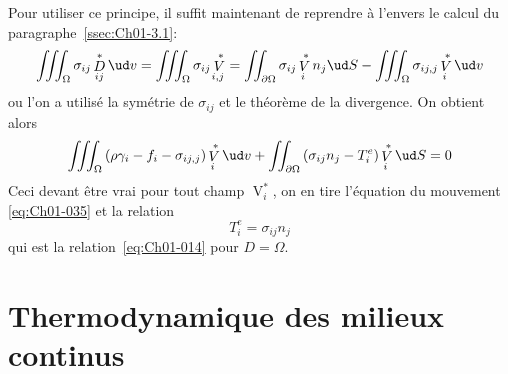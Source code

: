 Pour utiliser ce principe, il suffit maintenant de reprendre à l'envers le calcul du paragraphe~\ref{ssec:Ch01-3.1}:
\begin{equation*}
    \iiint_{\Omega} \sigma_{ij} \mathop{D}^{\ast}_{ij} \ud v = \iiint_{\Omega} \sigma_{ij} \mathop{V}^{\ast}_{i,j} = \iint_{\partial \Omega} \sigma_{ij} \mathop{V}^{\ast}_{i} n_j \ud S - \iiint_{\Omega} \sigma_{ij,j} \mathop{V}^{\ast}_{i} \ud v
\end{equation*}
ou l'on a utilisé la symétrie de $\sigma_{ij}$ et le théorème de la divergence.
On obtient alors
\begin{displaymath}
    \iiint_{\Omega} \left( \rho \gamma_i -f_i - \sigma_{ij,j} \right) \mathop{V}^{\ast}_i \ud v + \iint_{\partial \Omega} \left( \sigma_{ij} n_j - T_i^e \right) \mathop{V}^{\ast}_i \ud S = 0
\end{displaymath}
Ceci devant être vrai pour tout champ $\mathop{V}^{\ast}_i$, on en tire l'équation du mouvement \eqref{eq:Ch01-035} et la relation
\begin{equation}
    T_i^e = \sigma_{ij} n_j
    \label{eq:Ch01-039}
\end{equation}
qui est la relation~\eqref{eq:Ch01-014} pour $D=\Omega$. 

\section{Thermodynamique des milieux continus} \label{sec:Ch01-3}
